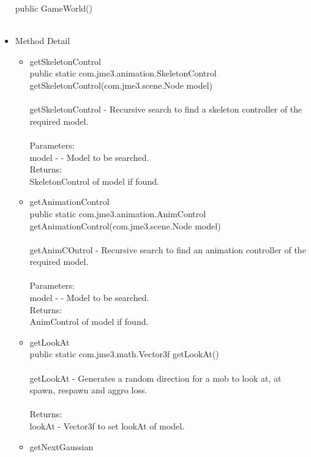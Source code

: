 \documentclass[letterpaper]{article}
\begin{document}
\begin{itemize}
										public GameWorld() \\ \\
								\item	Method Detail \\
										\begin{itemize}
											\item	getSkeletonControl \\
													public static com.jme3.animation.SkeletonControl \\ getSkeletonControl(com.jme3.scene.Node model) \\ \\
													getSkeletonControl - Recursive search to find a skeleton controller of the required model. \\ \\
													Parameters: \\
													model - - Model to be searched. \\
													Returns: \\
													SkeletonControl of model if found.
											\item	getAnimationControl \\
													public static com.jme3.animation.AnimControl getAnimationControl(com.jme3.scene.Node model) \\ \\
													getAnimCOntrol - Recursive search to find an animation controller of the required model. \\ \\
													Parameters: \\
													model - - Model to be searched. \\
													Returns: \\
													AnimControl of model if found. \\
											\item	getLookAt \\
													public static com.jme3.math.Vector3f getLookAt() \\ \\
													getLookAt - Generates a random direction for a mob to look at, at spawn, respawn and aggro loss. \\ \\
													Returns: \\
													lookAt - Vector3f to set lookAt of model. \\
											\item	getNextGaussian \\

\end{itemize}
\end{itemize}
\end{document}
